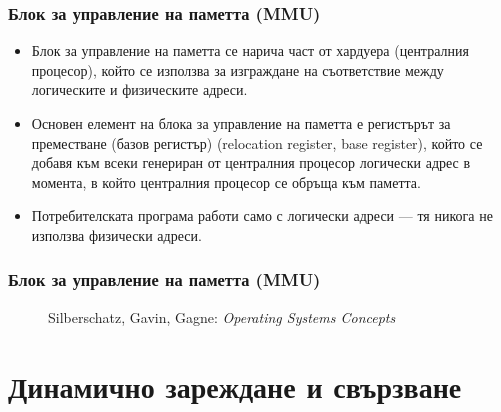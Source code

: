 \documentclass[ignorenonframetext, hyperref=unicode]{beamer}
\begin{document}
\begin{frame}
\frametitle{Блок за управление на паметта (MMU)}
\begin{itemize}
  \item Блок за управление на паметта се нарича част от хардуера (централния
  процесор), който се използва за изграждане на съответствие между 
  логическите и физическите адреси.
  \item Основен елемент на блока за управление на паметта е регистърът за
  преместване (базов регистър) (relocation register, base register), който се
  добавя към всеки генериран от централния процесор логически адрес в момента,
  в който централния процесор се обръща към паметта.
  \item Потребителската програма работи само с логически адреси — тя никога не
  използва физически адреси.
\end{itemize}
\end{frame}

\begin{frame}
\frametitle{Блок за управление на паметта (MMU)}
\begin{figure}[h]
\center
{}
\caption{Silberschatz, Gavin, Gagne: {\em Operating Systems Concepts}}
\end{figure}
\end{frame}

\section{Динамично зареждане и свързване}
\end{document}
